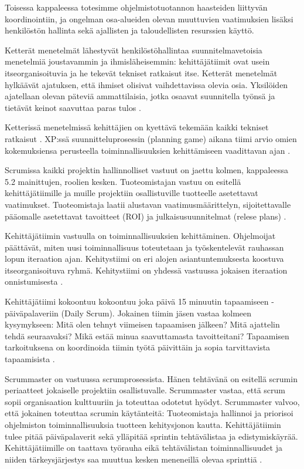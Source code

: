 \documentclass[finnish]{tktltiki2}
\theoremstyle{definition}
\theoremstyle{remark}
\begin{document}
{Toisessa kappaleessa totesimme ohjelmistotuotannon haasteiden liittyvän koordinointiin, ja ongelman osa-alueiden olevan muuttuvien vaatimuksien lisäksi henkilöstön hallinta sekä ajallisten ja taloudellisten resurssien käyttö. 

Ketterät menetelmät lähestyvät henkilöstöhallintaa suunnitelmavetoisia menetelmiä joustavammin ja ihmisläheisemmin: kehittäjätiimit ovat usein itseorganisoituvia ja he tekevät tekniset ratkaisut itse. Ketterät menetelmät hylkäävät ajatuksen, että ihmiset olisivat vaihdettavissa olevia osia. Yksilöiden ajatellaan olevan päteviä ammattilaisia, jotka osaavat suunnitella työnsä ja tietävät keinot saavuttaa paras tulos \cite{FOW01a}.

Ketterissä menetelmissä kehittäjien on kyettävä tekemään kaikki tekniset ratkaisut \cite{FOW01a}. XP:ssä suunnitteluprosessin (planning game) aikana tiimi arvio omien kokemuksiensa perusteella toiminnallisuuksien kehittämiseen vaadittavan ajan \cite{BEC99}.

Scrumissa kaikki projektin hallinnolliset vastuut on jaettu kolmen, kappaleessa 5.2 mainittujen, roolien kesken. Tuoteomistajan vastuu on esitellä kehittäjätiimille ja muille projektiin osallistuville tuotteelle asetettavat vaatimukset. Tuoteomistaja laatii alustavan vaatimusmäärittelyn, sijoitettavalle pääomalle asetettavat tavoitteet (ROI) ja julkaisusuunnitelmat (relese plans) \cite{SCH09}.

Kehittäjätiimin vastuulla on toiminnallisuuksien kehittäminen. Ohjelmoijat päättävät, miten uusi toiminnallisuus toteutetaan ja työskentelevät rauhassan lopun iteraation ajan. Kehitystiimi on eri alojen asiantuntemuksesta koostuva itseorganisoituva ryhmä. Kehitystiimi on yhdessä vastuussa jokaisen iteraation onnistumisesta \cite{SCH09}.

Kehittäjätiimi kokoontuu kokoontuu joka päivä 15 minuutin tapaamiseen - päiväpalaveriin (Daily Scrum). Jokainen tiimin jäsen vastaa kolmeen kysymykseen: Mitä olen tehnyt viimeisen tapaamisen jälkeen? Mitä ajattelin tehdä seuraavaksi? Mikä estää minua saavuttamasta tavoitteitani? Tapaamisen tarkoituksena on koordinoida tiimin työtä päivittäin ja sopia tarvittavista tapaamisista \cite{SCH09}.

Scrummaster on vastuussa scrumprosessista. Hänen tehtävänä on esitellä scrumin periaatteet jokaiselle projektiin osallistuvalle. Scrummaster vastaa, että scrum sopii organisaation kulttuuriin ja toteuttaa odotetut hyödyt. Scrummaster valvoo, että jokainen toteuttaa scrumin käytänteitä: Tuoteomistaja hallinnoi ja priorisoi ohjelmiston toiminnallisuuksia tuotteen kehitysjonon kautta. Kehittäjätiimin tulee pitää päiväpalaverit sekä ylläpitää sprintin tehtävälistaa ja edistymiskäyrää. Kehittäjätiimille on taattava työrauha eikä tehtävälistan toiminnallisuudet ja niiden tärkeysjärjestys saa muuttua kesken meneneillä olevaa sprinttiä \cite{SCH09}.

}
\end{document}
